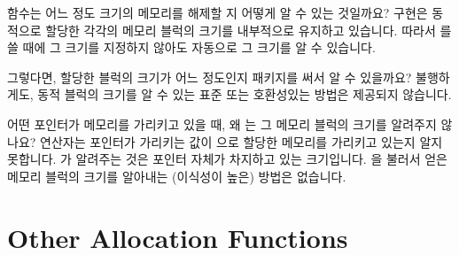 \begin{faq}
	 함수는 어느 정도 크기의 메모리를 해제할 지
	어떻게 알 수 있는 것일까요?
\A
	 구현은 동적으로 할당한 각각의 메모리 블럭의 크기를
	내부적으로 유지하고 있습니다.  따라서 를 쓸 때에
	그 크기를 지정하지 않아도 자동으로 그 크기를 알 수 있습니다.
\end{faq}

\begin{faq}
	그렇다면, 할당한 블럭의 크기가 어느 정도인지 
	패키지를 써서 알 수 있을까요?
\A
	불행하게도, 동적 블럭의 크기를 알 수 있는 표준 또는 호환성있는
	방법은 제공되지 않습니다.
\end{faq}

\begin{faq}
        어떤 포인터가 메모리를 가리키고 있을 때, 왜 는 그 메모리
        블럭의 크기를 알려주지 않나요?
\A
         연산자는 포인터가 가리키는 값이 으로 할당한
        메모리를 가리키고 있는지 알지 못합니다. 가 알려주는 것은
        포인터 자체가 차지하고 있는 크기입니다. 을 불러서 얻은
        메모리 블럭의 크기를 알아내는 (이식성이 높은) 방법은 없습니다.
\end{faq}

\section{Other Allocation Functions}

